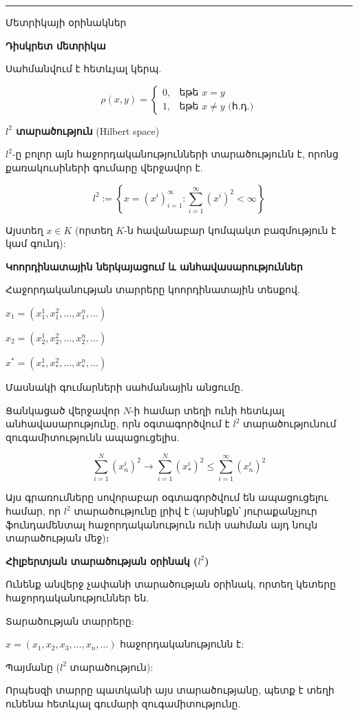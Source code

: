 \documentclass[12pt, a4paper]{article}
\begin{document}
\vspace{1em}
\hrule
\vspace{1em}

Մետրիկայի օրինակներ

\textbf{Դիսկրետ մետրիկա}

Սահմանվում է հետևյալ կերպ.

$$\rho(x, y) = \begin{cases} 0, & \text{եթե } x = y \\ 1, & \text{եթե } x \neq y \text{ (հ.դ.)} \end{cases}$$

\textbf{$l^2$ տարածություն} (Hilbert space)

$l^2$-ը բոլոր այն հաջորդականությունների տարածությունն է, որոնց քառակուսիների գումարը վերջավոր է.

$$l^2 := \left\{ x = (x^i)_{i=1}^{\infty} : \sum_{i=1}^{\infty} (x^i)^2 < \infty \right\}$$

Այստեղ $x \in K$ (որտեղ $K$-ն հավանաբար կոմպակտ բազմություն է կամ գունդ):

\textbf{Կոորդինատային ներկայացում և անհավասարություններ}

Հաջորդականության տարրերը կոորդինատային տեսքով.

$x_1 = (x_1^1, x_1^2, \dots, x_1^n, \dots)$

$x_2 = (x_2^1, x_2^2, \dots, x_2^n, \dots)$

$x^* = (x_*^1, x_*^2, \dots, x_*^n, \dots)$

Մասնակի գումարների սահմանային անցումը.

Ցանկացած վերջավոր $N$-ի համար տեղի ունի հետևյալ անհավասարությունը, որն օգտագործվում է $l^2$ տարածությունում զուգամիտությունն ապացուցելիս.

$$\sum_{i=1}^{N} (x_n^i)^2 \to \sum_{i=1}^{N} (x_*^i)^2 \le \sum_{i=1}^{\infty} (x_n^i)^2$$

Այս գրառումները սովորաբար օգտագործվում են ապացուցելու համար, որ $l^2$ տարածությունը լրիվ է (այսինքն՝ յուրաքանչյուր ֆունդամենտալ հաջորդականություն ունի սահման այդ նույն տարածության մեջ)։

\textbf{Հիլբերտյան տարածության օրինակ ($l^2$)}

Ունենք անվերջ չափանի տարածության օրինակ, որտեղ կետերը հաջորդականություններ են.

Տարածության տարրերը:

$x = (x_1, x_2, x_3, \dots, x_n, \dots)$ հաջորդականությունն է:

Պայմանը ($l^2$ տարածություն):

Որպեսզի տարրը պատկանի այս տարածությանը, պետք է տեղի ունենա հետևյալ գումարի զուգամիտությունը.
\end{document}
